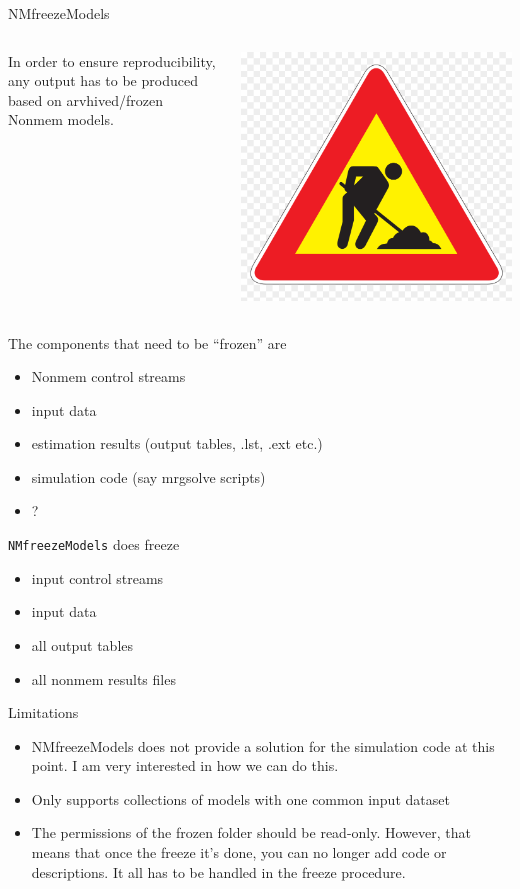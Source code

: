\documentclass[
  8pt,
  ignorenonframetext,
  aspectratio=169]{beamer}
\providecommand{\tightlist}{%
  \setlength{\itemsep}{0pt}\setlength{\parskip}{0pt}}
\begin{document}
\begin{frame}[fragile]{NMfreezeModels}
\protect\hypertarget{nmfreezemodels}{}
\begin{columns}[T]
\begin{column}{0.85\textwidth}
In order to ensure reproducibility, any output has to be produced based
on arvhived/frozen Nonmem models.
\end{column}

\begin{column}{0.15\textwidth}
\includegraphics[width=.5in]{figures/worksign.png}
\end{column}
\end{columns}

The components that need to be ``frozen'' are

\begin{itemize}
\tightlist
\item
  Nonmem control streams
\item
  input data
\item
  estimation results (output tables, .lst, .ext etc.)
\item
  simulation code (say mrgsolve scripts)
\item
  ?
\end{itemize}

\texttt{NMfreezeModels} does freeze

\begin{itemize}
\tightlist
\item
  input control streams
\item
  input data
\item
  all output tables
\item
  all nonmem results files
\end{itemize}

Limitations

\begin{itemize}
\tightlist
\item
  NMfreezeModels does not provide a solution for the simulation code at
  this point. I am very interested in how we can do this.
\item
  Only supports collections of models with one common input dataset
\item
  The permissions of the frozen folder should be read-only. However,
  that means that once the freeze it's done, you can no longer add code
  or descriptions. It all has to be handled in the freeze procedure.
\end{itemize}
\end{frame}
\end{document}
